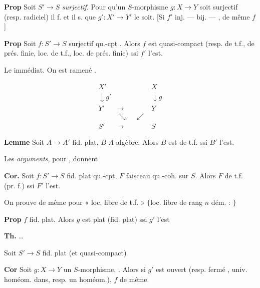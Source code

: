 \documentclass[11pt,a4paper]{article}
\begin{document}


\textbf{Prop} Soit $S' \to S$ \emph{surjectif}. Pour qu'un $S$-morphisme $g : X \to Y$ soit surjectif (resp. radiciel) il f. et il s. que $g' : X' \to Y'$ le soit. [Si $f'$ inj. --- bij. --- \ill{} , de même $f$]

\textbf{Prop} Soit $f : S' \to S$ surjectif qu.-cpt . Alors $f$ est quasi-compact (resp. de t.f., de prés. finie, loc. de t.f., loc. de prés. finie) ssi $f'$ l'est.

Le  \ill{} immédiat. On est ramené \ill{} \ill{}.

\[
\begin{array}{ccc}
X' & & X \\
\downarrow{\scriptstyle g'} & & \downarrow{\scriptstyle g} \\
Y' & \longrightarrow & Y \\
& \searrow \quad \swarrow & \\
S' & \longrightarrow & S
\end{array}
\]

\textbf{Lemme} Soit $A \to A'$ fid. plat, $B$ $A$-algèbre. Alors $B$ est de t.f.  ssi $B'$ l'est.

Les  \emph{arguments}, pour , donnent

\textbf{Cor.} Soit $f : S' \to S$ fid. plat qu.-cpt, $F$ faisceau qu.-coh. sur $S$. Alors $F$ de t.f. (pr. f.) ssi $F'$ l'est.

On prouve de même pour « loc. libre de t.f. » $\{$loc. libre de rang $n$ \quad dém. : $\}$

\textbf{Prop} $f$ fid. plat. Alors $g$ est plat (fid. plat) ssi $g'$ l'est 


\textbf{Th.} …

Soit $S' \to S$ fid. plat (et quasi-compact) 

\textbf{Cor} Soit $g : X \to Y$ un $S$-morphisme, \ill{}. Alors si $g'$ est ouvert (resp. fermé , univ. homéom. dans, resp. un homéom.), $f$ de même.
\end{document}
